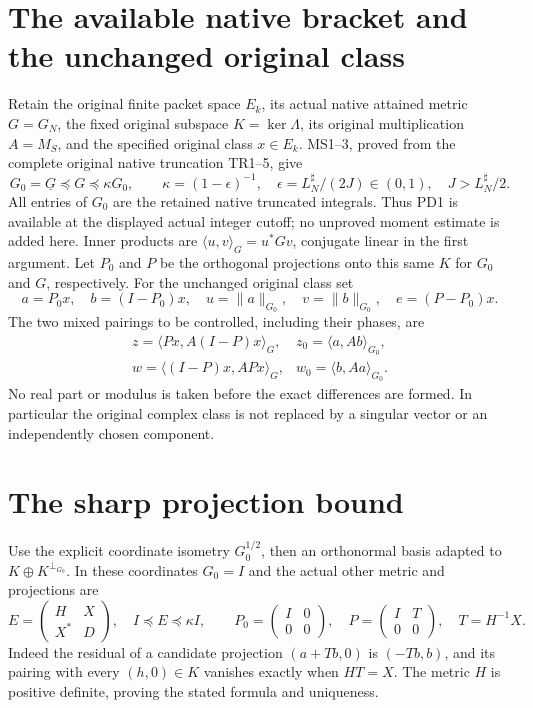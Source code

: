 \section{The available native bracket and the unchanged original class}
Retain the original finite packet space $E_k$, its actual native attained
metric $G=G_N$, the fixed original subspace $K=\ker\Lambda$, its original
multiplication $A=M_S$, and the specified original class $x\in E_k$.
MS1--3, proved from the complete original native truncation TR1--5, give
\[
 G_0=\underline G\preceq G\preceq\kappa G_0,\qquad
 \kappa=(1-\epsilon)^{-1},\quad
 \epsilon=L_N^\sharp/(2J)\in(0,1),\quad J>L_N^\sharp/2.          \tag{PD1}
\]
All entries of $G_0$ are the retained native truncated integrals.
Thus PD1 is available at the displayed actual integer cutoff; no
unproved moment estimate is added here.  Inner products are
$\langle u,v\rangle_G=u^*Gv$, conjugate linear in the first argument.
Let $P_0$ and $P$ be the orthogonal projections onto this same $K$
for $G_0$ and $G$, respectively.  For the unchanged original class set
\[
 a=P_0x,\quad b=(I-P_0)x,\quad
 u=\|a\|_{G_0},\quad v=\|b\|_{G_0},\quad
 e=(P-P_0)x.
                                                                    \tag{PD2}
\]
The two mixed pairings to be controlled, including their phases, are
\[
 \begin{array}{ll}
 z=\langle Px,A(I-P)x\rangle_G,
   &z_0=\langle a,Ab\rangle_{G_0},\\
 w=\langle(I-P)x,APx\rangle_G,
   &w_0=\langle b,Aa\rangle_{G_0}.
 \end{array}                                                       \tag{PD3}
\]
No real part or modulus is taken before the exact differences are
formed.  In particular the original complex class is not replaced
by a singular vector or an independently chosen component.

\section{The sharp projection bound}
Use the explicit coordinate isometry $G_0^{1/2}$, then an orthonormal
basis adapted to $K\oplus K^{\perp_{G_0}}$.  In these coordinates
$G_0=I$ and the actual other metric and projections are
\[
 E=\begin{pmatrix}H&X\\X^*&D\end{pmatrix},\quad I\preceq E\preceq\kappa I,
 \qquad P_0=\begin{pmatrix}I&0\\0&0\end{pmatrix},\quad
 P=\begin{pmatrix}I&T\\0&0\end{pmatrix},\quad T=H^{-1}X.          \tag{PD4}
\]
Indeed the residual of a candidate projection $(a+Tb,0)$ is
$(-Tb,b)$, and its pairing with every $(h,0)\in K$ vanishes exactly
when $HT=X$.  The metric $H$ is positive definite, proving the
stated formula and uniqueness.

